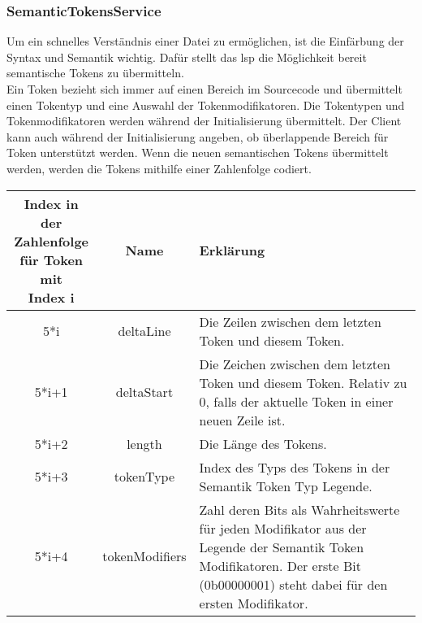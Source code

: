 \documentclass[./einleitung.tex]{subfiles}
\begin{document}
    \subsubsection{SemanticTokensService}
    Um ein schnelles Verständnis einer Datei zu ermöglichen, ist die Einfärbung der Syntax und Semantik wichtig.
    Dafür stellt das \acrshort{lsp} die Möglichkeit bereit semantische Tokens zu übermitteln.\\
    Ein Token bezieht sich immer auf einen Bereich im Sourcecode und übermittelt einen Tokentyp und eine Auswahl der Tokenmodifikatoren.
    Die Tokentypen und Tokenmodifikatoren werden während der Initialisierung übermittelt.
    Der Client kann auch während der Initialisierung angeben, ob überlappende Bereich für Token unterstützt werden.
    Wenn die neuen semantischen Tokens übermittelt werden, werden die Tokens mithilfe einer Zahlenfolge codiert.
    \begin{center}
        \begin{tabular}{| c | c | m{21.5em} |}
            \hline
            \makecell{Index in der\\ Zahlenfolge\\für Token mit \\Index i} & Name & Erklärung \\
            \hline
            5*i & deltaLine & Die Zeilen zwischen dem letzten Token und diesem Token. \\
            \hline
            5*i+1 & deltaStart & Die Zeichen zwischen dem letzten Token und diesem Token.
            Relativ zu 0, falls der aktuelle Token in einer neuen Zeile ist. \\
            \hline
            5*i+2 & length & Die Länge des Tokens. \\
            \hline
            5*i+3 & tokenType & Index des Typs des Tokens in der Semantik Token Typ Legende. \\
            \hline
            5*i+4 & tokenModifiers & Zahl deren Bits als Wahrheitswerte für jeden Modifikator aus der Legende der Semantik Token Modifikatoren.
            Der erste Bit (0b00000001) steht dabei für den ersten Modifikator. \\
            \hline
        \end{tabular}
    \end{center}
\end{document}
